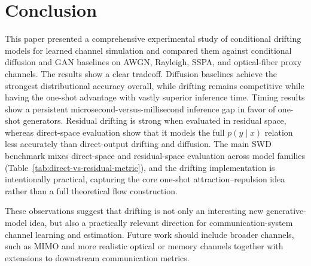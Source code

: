 \documentclass[conference]{IEEEtran}
\begin{document}
\section{Conclusion}
This paper presented a comprehensive experimental study of conditional drifting models for learned channel simulation and compared them against conditional diffusion and GAN baselines on AWGN, Rayleigh, SSPA, and optical-fiber proxy channels.
The results show a clear tradeoff.
Diffusion baselines achieve the strongest distributional accuracy overall, while drifting remains competitive while having the one-shot advantage with vastly superior inference time. Timing results show a persistent microsecond-versus-millisecond inference gap in favor of one-shot generators.
Residual drifting is strong when evaluated in residual space, whereas direct-space evaluation show that it models the full \(p(y\mid x)\) relation less accurately than direct-output drifting and diffusion.
The main SWD benchmark mixes direct-space and residual-space evaluation across model families (Table~\ref{tab:direct-vs-residual-metric}), and the drifting implementation is intentionally practical, capturing the core one-shot attraction--repulsion idea rather than a full theoretical flow construction.

These observations suggest that drifting is not only an interesting new generative-model idea, but also a practically relevant direction for communication-system channel learning and estimation.
Future work should include broader channels, such as MIMO and more realistic optical or memory channels together with extensions to downstream communication metrics.



\end{document}
